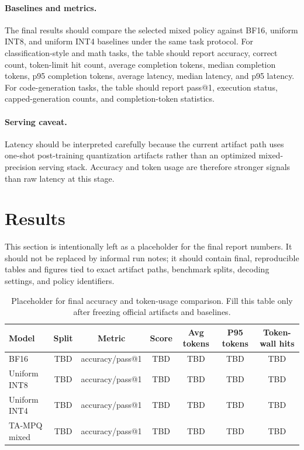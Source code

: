 \documentclass{article}
\newcommand{\method}{TA-MPQ}
\newcommand{\intfour}{INT4}
\newcommand{\inteight}{INT8}
\begin{document}
\paragraph{Baselines and metrics.}
The final results should compare the selected mixed policy against BF16, uniform \inteight{}, and uniform \intfour{} baselines under the same task protocol. For classification-style and math tasks, the table should report accuracy, correct count, token-limit hit count, average completion tokens, median completion tokens, p95 completion tokens, average latency, median latency, and p95 latency. For code-generation tasks, the table should report pass@1, execution status, capped-generation counts, and completion-token statistics.

\paragraph{Serving caveat.}
Latency should be interpreted carefully because the current artifact path uses one-shot post-training quantization artifacts rather than an optimized mixed-precision serving stack. Accuracy and token usage are therefore stronger signals than raw latency at this stage.

\section{Results}
\label{sec:results}

This section is intentionally left as a placeholder for the final report numbers. It should not be replaced by informal run notes; it should contain final, reproducible tables and figures tied to exact artifact paths, benchmark splits, decoding settings, and policy identifiers.

\begin{table}[t]
\caption{Placeholder for final accuracy and token-usage comparison. Fill this table only after freezing official artifacts and baselines.}
\label{tab:results-placeholder}
\centering
\begin{tabular}{lcccccc}
\toprule
Model & Split & Metric & Score & Avg tokens & P95 tokens & Token-wall hits \\
\midrule
BF16 & TBD & accuracy/pass@1 & TBD & TBD & TBD & TBD \\
Uniform \inteight{} & TBD & accuracy/pass@1 & TBD & TBD & TBD & TBD \\
Uniform \intfour{} & TBD & accuracy/pass@1 & TBD & TBD & TBD & TBD \\
\method{} mixed & TBD & accuracy/pass@1 & TBD & TBD & TBD & TBD \\
\bottomrule
\end{tabular}
\end{table}
\end{document}
